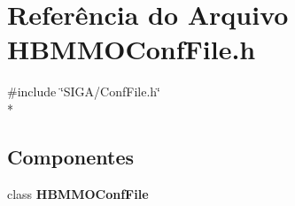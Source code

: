 \section{Referência do Arquivo H\+B\+M\+M\+O\+Conf\+File.\+h}
\label{_h_b_m_m_o_conf_file_8h}
{\ttfamily \#include \char`\"{}S\+I\+G\+A/\+Conf\+File.\+h\char`\"{}}\\*
\subsection*{Componentes}
\begin{DoxyCompactItemize}
\item 
class {\bf H\+B\+M\+M\+O\+Conf\+File}
\end{DoxyCompactItemize}
